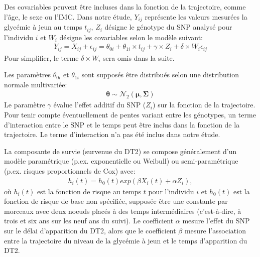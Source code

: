 \documentclass[11pt, a4paper]{article}
\begin{document}
\par{Des covariables peuvent être incluses dans la fonction de la trajectoire, comme l'âge, le sexe ou l'IMC.
Dans notre étude, $Y_{ij}$ représente les valeurs mesurées la glycémie à jeun au temps $t_{ij}$, $Z_i$ désigne le génotype du SNP analysé pour l'individu $i$ et $W_i$ désigne les covariables selon le modèle suivant:
\begin{eqnarray}Y_{ij}=X_{ij}+\epsilon_{ij}=\theta_{0i}+\theta_{1i}\times t_{ij}+\gamma \times Z_i+\delta \times W_i\epsilon_{ij}\label{eq:3}\end{eqnarray}
Pour simplifier, le terme $\delta \times W_i$ sera omis dans la suite.}

\par{Les paramètres $\theta_{0i}$ et $\theta_{1i}$ sont supposés être distribués selon une distribution normale multivariée:
\begin{eqnarray}\boldsymbol\theta \sim \mathcal{N}_2(\boldsymbol\mu, \boldsymbol\Sigma)\label{eq:4}\end{eqnarray}
Le paramètre $\gamma$ évalue l'effet additif du SNP ($Z_i$) sur la fonction de la trajectoire.
Pour tenir compte éventuellement de pentes variant entre les génotypes, un terme d'interaction entre le SNP et le temps peut être inclus dans la fonction de la trajectoire.
Le terme d'interaction n'a pas été inclus dans notre étude.}

\par{La composante de survie (survenue du DT2) se compose généralement d'un modèle paramétrique (p.ex. exponentielle ou Weibull) ou semi-paramétrique (p.ex. risques proportionnels de Cox) avec:
\begin{eqnarray}h_i(t)=h_0(t) exp(\beta X_i(t)+\alpha Z_i),\label{eq:5}\end{eqnarray}
où $h_i(t)$ est la fonction de risque au temps $t$ pour l'individu $i$ et $h_0(t)$ est la fonction de risque de base non spécifiée, supposée être une constante par morceaux avec deux noeuds placés à des temps intermédiaires
(c'est-à-dire, à trois et six ans sur les neuf ans du suivi). Le coefficient $\alpha$ mesure l'effet du SNP sur le délai d'apparition du DT2,
alors que le coefficient $\beta$ mesure l'association entre la trajectoire du niveau de la glycémie à jeun et le temps d'apparition du DT2.}

\clearpage
\end{document}
